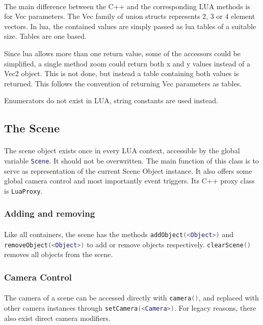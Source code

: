 \paragraph{}
The main difference between the C++ and the corresponding LUA methods is for Vec parameters.
The Vec family of union structs represents 2, 3 or 4 element vectors.
In lua, the contained values are simply passed as lua tables of a suitable size.
Tables are one based.

Since lua allows more than one return value, some of the accessors could be simplified, a single method zoom could return both x and y values instead of a Vec2 object.
This is not done, but instead a table containing both values is returned.
This follows the convention of returning Vec parameters as tables.

Enumerators do not exist in LUA, string constants are used instead.

\subsection{The Scene}
\paragraph{}
The scene object exists once in every LUA context, accessible by the global variable \lstinline[language=lua]{Scene}. It should not be overwritten.
The main function of this class is to serve as representation of the current Scene Object instance.
It also offers some global camera control and most importantly event triggers.
Its C++ proxy class is \lstinline{LuaProxy}.

\subsubsection{Adding and removing}
\paragraph{}
Like all containers, the scene has the methods \lstinline[language=lua]{addObject(<Object>)} and \lstinline[language=lua]{removeObject(<Object>)} to add or remove objects respectively.
\lstinline[language=lua]{clearScene()} removes all objects from the scene.

\subsubsection{Camera Control}
\paragraph{}
The camera of a scene can be accessed directly with \lstinline[language=lua]{camera()}, and replaced with other camera instances through \lstinline[language=lua]{setCamera(<Camera>)}.
For legacy reasons, there also exist direct camera modifiers.

